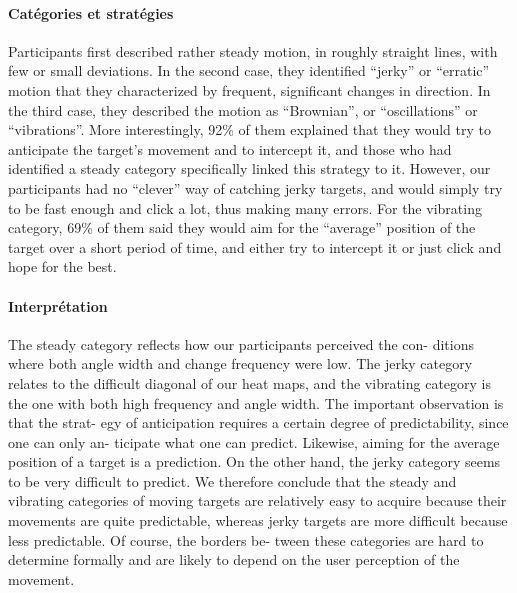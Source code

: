 \paragraph{Catégories et stratégies}
Participants first described rather steady motion, in roughly straight lines, with few or small deviations. In the second case, they identified “jerky” or “erratic” motion that they characterized by frequent, significant changes in direction. In the third case, they described the motion as “Brownian”, or “oscillations” or “vibrations”. More interestingly, 92\%{} of them explained that they would try to anticipate the target’s movement and to intercept it, and those who had identified a steady category specifically linked this strategy to it. However, our participants had no “clever” way of catching jerky targets, and would simply try to be fast enough and click a lot, thus making many errors. For the vibrating category, 69\%{} of them said
they would aim for the “average” position of the target over a short period of time, and either try to intercept it or just click and hope for the best.

\paragraph{Interprétation}
The steady category reflects how our participants perceived the con-
ditions where both angle width and change frequency were low. The jerky category
relates to the difficult diagonal of our heat maps, and the vibrating category is the one
with both high frequency and angle width. The important observation is that the strat-
egy of anticipation requires a certain degree of predictability, since one can only an-
ticipate what one can predict. Likewise, aiming for the average position of a target is a
prediction. On the other hand, the jerky category seems to be very difficult to predict.
We therefore conclude that the steady and vibrating categories of moving targets
are relatively easy to acquire because their movements are quite predictable, whereas
jerky targets are more difficult because less predictable. Of course, the borders be-
tween these categories are hard to determine formally and are likely to depend on the
user perception of the movement.

